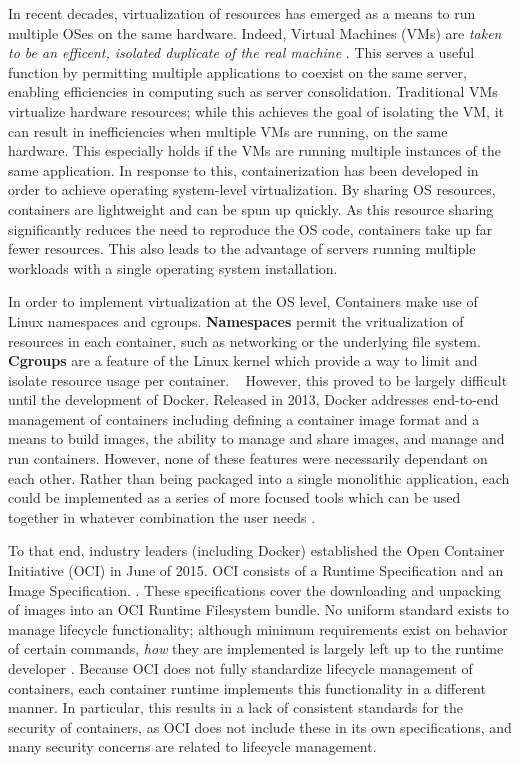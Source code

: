 In recent decades, virtualization of resources has emerged as a means to run multiple OSes on the same hardware. Indeed, Virtual Machines (VMs) are \emph{taken to be an efficent, isolated duplicate of the real machine} \cite{Popek:1974:FRV:361011.361073}. This serves a useful function by permitting multiple applications to coexist on the same server, enabling efficiencies in computing such as server consolidation. Traditional VMs virtualize hardware resources; while this achieves the goal of isolating the VM, it can result in inefficiencies when multiple VMs are running, on the same hardware. This especially holds if the VMs are running multiple instances of the same application. In response to this, containerization has been developed in order to achieve operating system-level virtualization. By sharing OS resources, containers are lightweight and can be spun up quickly. As this resource sharing significantly reduces the need to reproduce the OS code, containers take up far fewer resources. This also leads to the advantage of servers running multiple workloads with a single operating system installation.


In order to implement virtualization at the OS level, Containers make use of Linux namespaces and cgroups. \textbf{Namespaces} permit the vritualization of resources in each container, such as networking or the underlying file system. \textbf{Cgroups} are a feature of the Linux kernel which provide a way to limit and isolate resource usage per container. \cite{lewis_2017}  However, this proved to be largely difficult until the development of Docker. Released in 2013, Docker addresses end-to-end management of containers including defining a container image format and a means to build images, the ability to manage and share images, and manage and run containers. However, none of these features were necessarily dependant on each other. Rather than being packaged into a single monolithic application, each could be implemented as a series of more focused tools which can be used together in whatever combination the user needs \cite{lewis_2017}.  

To that end, industry leaders (including Docker) established the Open Container Initiative (OCI) in June of 2015. OCI consists of a Runtime Specification and an Image Specification. \cite{open_containers_initiative_2016}. These specifications cover the downloading and unpacking of images into an OCI Runtime Filesystem bundle. No uniform standard exists to manage lifecycle functionality; although minimum requirements exist on behavior of certain commands, \emph{how} they are implemented is largely left up to the runtime developer \cite{opencontainers_runtime-spec_2017}. Because OCI does not fully standardize lifecycle management of containers, each container runtime implements this functionality in a different manner. In particular, this results in a lack of consistent standards for the security of containers, as OCI does not include these in its own specifications, and many security concerns are related to lifecycle management.

